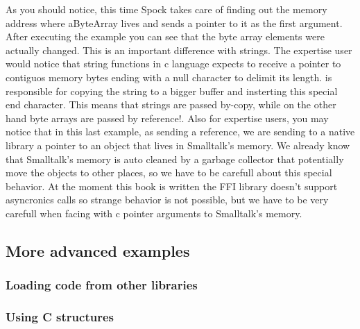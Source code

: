 \documentclass[a4paper,10pt,twoside]{book}
\begin{document}
As you should notice, this time Spock takes care of finding out the memory address where aByteArray lives and sends a pointer to it as the first argument. After executing the example you can see that the byte array elements were actually changed. This is an important difference with strings. The expertise user would notice that string functions in c language expects to receive a pointer to contiguos memory bytes ending with a null character to delimit its length. \Spock is responsible for copying the string to a bigger buffer and insterting this special end character. This means that strings are passed by-copy, while on the other hand byte arrays are passed by reference!. Also for expertise users, you may notice that in this last example, as sending a reference, we are sending to a native library a pointer to an object that lives in Smalltalk's memory. We already know that Smalltalk's memory is auto cleaned by a garbage collector that potentially move the objects to other places, so we have to be carefull about this special behavior. At the moment this book is written the FFI library doesn't support asyncronics calls so strange behavior is not possible, but we have to be very carefull when facing with c pointer arguments to Smalltalk's memory.

\subsection{More advanced examples}

\subsubsection{Loading code from other libraries}

\subsubsection{Using C structures}

% 
% 
% 
\end{document}
